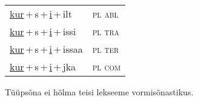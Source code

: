 \begin{minipage}{\textwidth}
\begin{sideways}
\begin{tabular}{l l}
\underline{kur}\,+\,s\,+\,\underline{i}\,+\,ilt & \textsc{ pl abl } \\
\underline{kur}\,+\,s\,+\,\underline{i}\,+\,issi & \textsc{ pl tra } \\
\underline{kur}\,+\,s\,+\,\underline{i}\,+\,issaa & \textsc{ pl ter } \\
\underline{kur}\,+\,s\,+\,\underline{i}\,+\,jka & \textsc{ pl com } \\
\end{tabular}
\end{sideways}
\label{tab:tüüpsõnamall-kursi}

\end{minipage}

 
\vspace{1em}
\noindent Tüüpsõna ei hõlma teisi lekseeme vormi\-sõnastikus.
